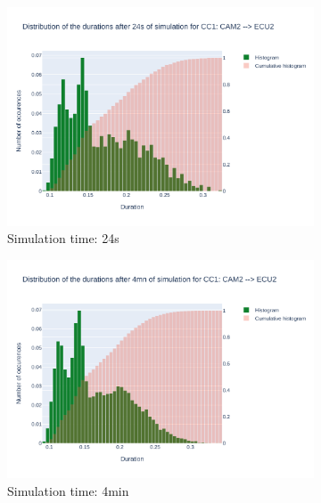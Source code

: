\documentclass{article}
\begin{document}
\begin{figure}[H]
    \centering
    \begin{subfigure}{.495\textwidth}
        \centering
        \includegraphics[width=\textwidth]{../fig/data/CC1: CAM2 --> ECU2_24s.png}
        \caption{Simulation time: 24s}
        \vspace{.5cm}
    \end{subfigure}
    \begin{subfigure}{.495\textwidth}
        \centering
        \includegraphics[width=\textwidth]{../fig/data/CC1: CAM2 --> ECU2_4mn.png}
        \caption{Simulation time: 4min}
        \vspace{.5cm}
    \end{subfigure}
    \begin{subfigure}{.495\textwidth}

\end{subfigure}
\end{figure}
\end{document}
